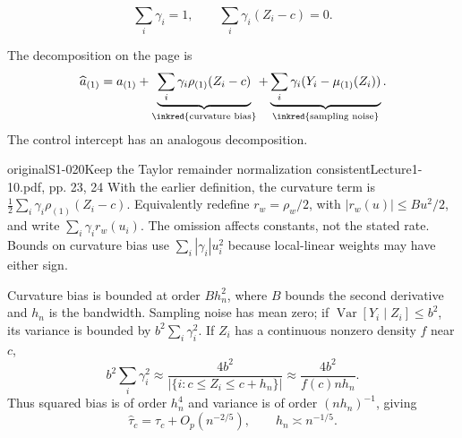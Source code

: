 \[
\sum_i\gamma_i=1,\qquad \sum_i\gamma_i(Z_i-c)=0.
\]

The decomposition on the page is
\[
\widehat a_{(1)}=a_{(1)}+\underbrace{\sum_i\gamma_i\rho_{(1)}(Z_i-c)}_{\text{\inkred{curvature bias}}}
+\underbrace{\sum_i\gamma_i(Y_i-\mu_{(1)}(Z_i))}_{\text{\inkred{sampling noise}}}.
\]
The control intercept has an analogous decomposition.
\begin{reviewnote}{original}{S1-020}{Keep the Taylor remainder normalization consistent}{Lecture1-10.pdf, pp. 23, 24}
With the earlier definition, the curvature term is $\tfrac12\sum_i\gamma_i\rho_{(1)}(Z_i-c)$. Equivalently redefine $r_w=\rho_w/2$, with $|r_w(u)|\le Bu^2/2$, and write $\sum_i\gamma_i r_w(u_i)$. The omission affects constants, not the stated rate. Bounds on curvature bias use $\sum_i|\gamma_i|u_i^2$ because local-linear weights may have either sign.
\end{reviewnote}
  Curvature bias is bounded at order $Bh_n^2$, where $B$ bounds the second derivative and $h_n$ is the bandwidth. Sampling noise has mean zero; if $\operatorname{Var}[Y_i\mid Z_i]\leq b^2$, its variance is bounded by $b^2\sum_i\gamma_i^2$.
If $Z_i$ has a continuous nonzero density $f$ near $c$,
\[
b^2\sum_i\gamma_i^2\approx\frac{4b^2}{|\{i:c\leq Z_i\leq c+h_n\}|}
\approx\frac{4b^2}{f(c)nh_n}.
\]
Thus squared bias is of order $h_n^4$ and variance is of order $(nh_n)^{-1}$, giving
\[
\widehat\tau_c=\tau_c+O_p(n^{-2/5}),\qquad h_n\asymp n^{-1/5}.
\]

